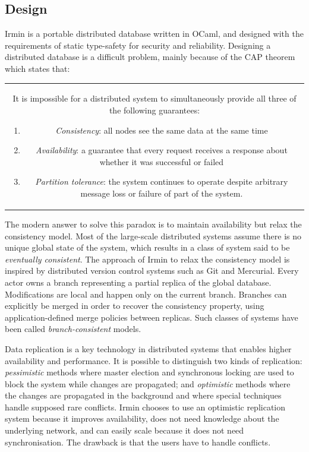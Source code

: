 \documentclass{article}
\newcommand{\irmin}{Irmin\xspace}
\newcommand{\git}{Git\xspace}
\newcommand{\mercurial}{Mercurial\xspace}
\newcommand{\ocaml}{OCaml\xspace}
\begin{document}
\subsection{Design}

\irmin is a portable distributed database written in \ocaml, and designed with the requirements of static type-safety for security and reliability.
Designing a distributed database is a difficult problem, mainly because of the CAP theorem\cite{BrewerConjecture2002} which states that:

\bigskip
\begin{tabular}{|c}
\begin{minipage}{0.9\textwidth}
It is impossible for a distributed system to simultaneously provide all three of the following guarantees:
\begin{enumerate}
	\item \emph{Consistency}: all nodes see the same data at the same time
	\item \emph{Availability}: a guarantee that every request receives a response about whether it was successful or failed
	\item \emph{Partition tolerance}: the system continues to operate despite arbitrary message loss or failure of part of the system.
\end{enumerate}
\end{minipage}
\end{tabular}
\bigskip

The modern answer to solve this paradox is to maintain availability but relax the consistency model.
Most of the large-scale distributed systems assume there is no unique global state of the system, which results in a class of system said to be \emph{eventually consistent}\cite{EventuallyConsistentTransactions2012}.
The approach of \irmin to relax the consistency model is inspired by distributed version control systems such as \git and \mercurial.
Every actor owns a branch representing a partial replica of the global database.
Modifications are local and happen only on the current branch.
Branches can explicitly be merged in order to recover the consistency property, using application-defined merge policies between replicas.
Such classes of systems have been called \emph{branch-consistent} models.

Data replication is a key technology in distributed systems that enables higher availability and performance.
It is possible to distinguish two kinds of replication:
\emph{pessimistic}\cite{ImplementingFaulttolerantServices1990}\cite{ParttimeParliament1998}\cite{UnderstandableConsensusAlgorithm2014} methods where master election and synchronous locking are used to block the system while changes are propagated;
and \emph{optimistic}\cite{OptimisticReplication2005} methods where the changes are propagated in the background and where special techniques handle supposed rare conflicts.
\irmin chooses to use an optimistic replication system because it improves availability, does not need knowledge about the underlying network, and can easily scale because it does not need synchronisation.
The drawback is that the users have to handle conflicts.
\end{document}
